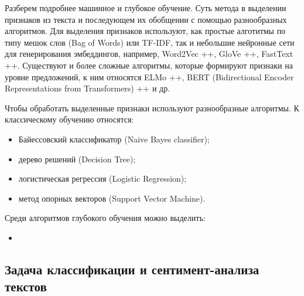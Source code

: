 \bigskip\par
Разберем подробнее машинное и глубокое обучение. Суть метода в выделении признаков из текста и последующем их
обобщении с помощью разнообразных алгоритмов. Для выделения признаков используют, как простые алготитмы по
типу мешок слов (Bag of Words) или TF-IDF, так и небольшие нейронные сети для генерирования эмбеддингов,
например, Word2Vec ++, GloVe ++, FastText ++. Существуют и более сложные алгоритмы, которые формируют признаки
на уровне предложений, к ним относятся ELMo ++, BERT (Bidirectional Encoder Representations from Transformers)
++ и др.

\bigskip\par
Чтобы обработать выделенные признаки используют разнообразные алгоритмы. К классическому обучению относятся:
\bigskip
\begin{itemize}
 \item Байессовский классификатор (Naive Bayes classifier);
 \item дерево решений (Decision Tree);
 \item логистическая регрессия (Logistic Regression);
 \item метод опорных векторов (Support Vector Machine).
\end{itemize}

\bigskip\par
Среди алгоритмов глубокого обучения можно выделить:
\begin{itemize}
 \item
\end{itemize}


\subsection{Задача классификации и сентимент-анализа текстов}












































